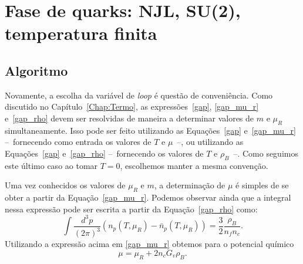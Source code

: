 \FloatBarrier

\section{Fase de quarks: NJL, SU(2), temperatura finita}

\subsection{Algoritmo}

Novamente, a escolha da variável de \emph{loop} é questão de conveniência. Como discutido no Capítulo~\ref{Chap:Termo}, as expressões~\eqref{gap}, \eqref{gap_mu_r} e~\eqref{gap_rho} devem ser resolvidas de maneira a determinar valores de $m$ e $\mu_R$ simultaneamente. Isso pode ser feito utilizando as Equações~\eqref{gap} e~\eqref{gap_mu_r} --~fornecendo como entrada os valores de $T$ e $\mu$~--, ou utilizando as Equações~\eqref{gap} e~\eqref{gap_rho} --~fornecendo os valores de $T$ e $\rho_B$~--. Como seguimos este último caso ao tomar $T = 0$, escolhemos manter a mesma convenção.

Uma vez conhecidos os valores de $\mu_R$ e $m$, a determinação de $\mu$ é simples de se obter a partir da Equação~\eqref{gap_mu_r}. Podemos observar ainda que a integral nessa expressão pode ser escrita a partir da Equação~\eqref{gap_rho} como:
\begin{equation}
	\int \frac{d^3p}{(2\pi)^3}(n_p(T, \mu_R) - \bar{n}_p(T, \mu_R)) = \frac{3}{2} \frac{\rho_B}{n_f n_c}.
\end{equation}
%
Utilizando a expressão acima em \eqref{gap_mu_r} obtemos para o potencial químico
\begin{equation}\label{Eq:pot_quim_loop_bar_dens}
	\mu = \mu_R + 2 n_c G_v \rho_B.
\end{equation}

